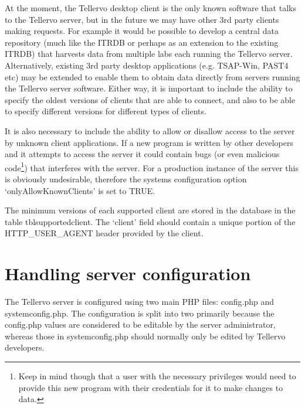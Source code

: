 At the moment, the Tellervo desktop client is the only known software that talks to the Tellervo server, but in the future we may have other 3rd party clients making requests.  For example it would be possible to develop a central data repository (much like the ITRDB or perhaps as an extension to the existing ITRDB) that harvests data from multiple labs each running the Tellervo server. Alternatively, existing 3rd party desktop applications (e.g. TSAP-Win, PAST4 etc) may be extended to enable them to obtain data directly from servers running the Tellervo server software.  Either way, it is important to include the ability to specify the oldest versions of clients that are able to connect, and also to be able to specify different versions for different types of clients. 

It is also necessary to include the ability to allow or disallow access to the server by unknown client applications.  If a new program is written by other developers and it attempts to access the server it could contain bugs (or even malicious code\footnote{Keep in mind though that a user with the necessary privileges would need to provide this new program with their credentials for it to make changes to data.}) that interferes with the server.  For a production instance of the server this is obviously undesirable, therefore the systems configuration option `onlyAllowKnownClients' is set to TRUE.  

The minimum versions of each supported client are stored in the database in the table tblsupportedclient.  The `client' field should contain a unique portion of the HTTP\_USER\_AGENT header provided by the client.  


\section{Handling server configuration}
The Tellervo server is configured using two main PHP files: config.php and systemconfig.php.  The configuration is split into two primarily because the config.php values are considered to be editable by the server administrator, whereas those in systemconfig.php should normally only be edited by Tellervo developers.  

